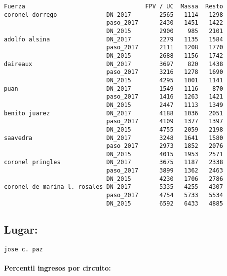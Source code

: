 \documentclass[11pt]{article}
\begin{document}
\begin{verbatim}
Fuerza                                  FPV / UC  Massa  Resto  
coronel dorrego              DN_2017        2565   1114   1298  
                             paso_2017      2430   1451   1422  
                             DN_2015        2900    985   2101  
adolfo alsina                DN_2017        2279   1135   1584  
                             paso_2017      2111   1208   1770  
                             DN_2015        2688   1156   1742  
daireaux                     DN_2017        3697    820   1438  
                             paso_2017      3216   1278   1690  
                             DN_2015        4295   1001   1141  
puan                         DN_2017        1549   1116    870  
                             paso_2017      1416   1263   1421  
                             DN_2015        2447   1113   1349  
benito juarez                DN_2017        4188   1036   2051  
                             paso_2017      4109   1377   1397  
                             DN_2015        4755   2059   2198  
saavedra                     DN_2017        3248   1641   1580  
                             paso_2017      2973   1852   2076  
                             DN_2015        4015   1953   2571  
coronel pringles             DN_2017        3675   1187   2338  
                             paso_2017      3899   1362   2463  
                             DN_2015        4230   1706   2786  
coronel de marina l. rosales DN_2017        5335   4255   4307  
                             paso_2017      4754   5733   5534  
                             DN_2015        6592   6433   4885  
    \end{verbatim}

    
    \hypertarget{lugar}{%
\subsection{Lugar:}\label{lugar}}

    
    \begin{Verbatim}[commandchars=\\\{\}]
jose c. paz

    \end{Verbatim}

    \hypertarget{percentil-ingresos-por-circuito}{%
\paragraph{Percentil ingresos por
circuito:}\label{percentil-ingresos-por-circuito}}
\end{document}
